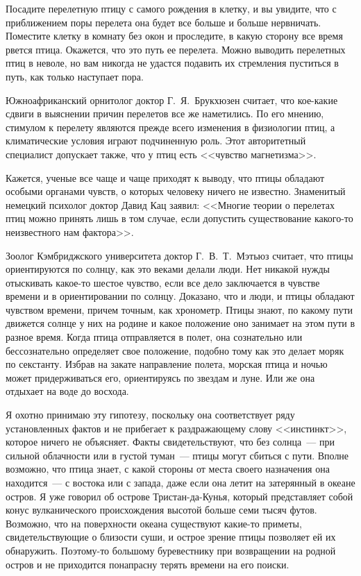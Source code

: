 \documentclass[12pt,a4paper,twoside,openany,svgnames]{memoir}
\begin{document}
Посадите перелетную птицу с самого рождения в клетку, и вы увидите, что с приближением поры перелета она будет все больше и больше нервничать. Поместите клетку в комнату без окон и проследите, в какую сторону все время рвется птица. Окажется, что это путь ее перелета. Можно выводить перелетных птиц в неволе, но вам никогда не удастся подавить их стремления пуститься в путь, как только наступает пора.

Южноафриканский орнитолог доктор Г.~Я.~Брукхюзен считает, что кое-какие сдвиги в выяснении причин перелетов все же наметились. По его мнению, стимулом к перелету являются прежде всего изменения в физиологии птиц, а климатические условия играют подчиненную роль. Этот авторитетный специалист допускает также, что у птиц есть <<чувство магнетизма>>.

Кажется, ученые все чаще и чаще приходят к выводу, что птицы обладают особыми органами чувств, о которых человеку ничего не известно. Знаменитый немецкий психолог доктор Давид Кац заявил: <<Многие теории о перелетах птиц можно принять лишь в том случае, если допустить существование какого-то неизвестного нам фактора>>.

Зоолог Кэмбриджского университета доктор Г.~В.~Т.~Мэтьюз считает, что птицы ориентируются по солнцу, как это веками делали люди. Нет никакой нужды отыскивать какое-то шестое чувство, если все дело заключается в чувстве времени и в ориентировании по солнцу. Доказано, что и люди, и птицы обладают чувством времени, причем точным, как хронометр. Птицы знают, по какому пути движется солнце у них на родине и какое положение оно занимает на этом пути в разное время. Когда птица отправляется в полет, она сознательно или бессознательно определяет свое положение, подобно тому как это делает моряк по секстанту. Избрав на закате направление полета, морская птица и ночью может придерживаться его, ориентируясь по звездам и луне. Или же она отдыхает на воде до восхода.

Я охотно принимаю эту гипотезу, поскольку она соответствует ряду установленных фактов и не прибегает к раздражающему слову <<инстинкт>>, которое ничего не объясняет. Факты свидетельствуют, что без солнца~--- при сильной облачности или в густой туман~--- птицы могут сбиться с пути. Вполне возможно, что птица знает, с какой стороны от места своего назначения она находится~--- с востока или с запада, даже если она летит на затерянный в океане остров. Я уже говорил об острове Тристан-да-Кунья, который представляет собой конус вулканического происхождения высотой больше семи тысяч футов. Возможно, что на поверхности океана существуют какие-то приметы, свидетельствующие о близости суши, и острое зрение птицы позволяет ей их обнаружить. Поэтому-то большому буревестнику при возвращении на родной остров и не приходится понапрасну терять времени на его поиски.
\end{document}
